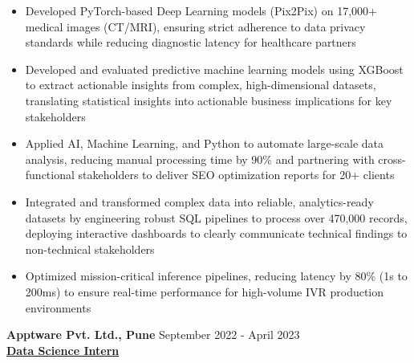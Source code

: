 \documentclass[10pt]{article}
\begin{document}
\begin{itemize}[left=0pt, itemsep=0pt]
    \item Developed PyTorch-based Deep Learning models (Pix2Pix) on 17,000+ medical images (CT/MRI), ensuring strict adherence to data privacy standards while reducing diagnostic latency for healthcare partners
    \item Developed and evaluated predictive machine learning models using XGBoost to extract actionable insights from complex, high-dimensional datasets, translating statistical insights into actionable business implications for key stakeholders
    \item Applied AI, Machine Learning, and Python to automate large-scale data analysis, reducing manual processing time by 90\% and partnering with cross-functional stakeholders to deliver SEO optimization reports for 20+ clients
    \item Integrated and transformed complex data into reliable, analytics-ready datasets by engineering robust SQL pipelines to process over 470,000 records, deploying interactive dashboards to clearly communicate technical findings to non-technical stakeholders
    \item Optimized mission-critical inference pipelines, reducing latency by 80\% (1s to 200ms) to ensure real-time performance for high-volume IVR production environments

\end{itemize}
\textbf{Apptware Pvt. Ltd., Pune} \hfill September 2022 - April 2023 \\
\textbf{\underline{Data Science Intern}}
\end{document}
